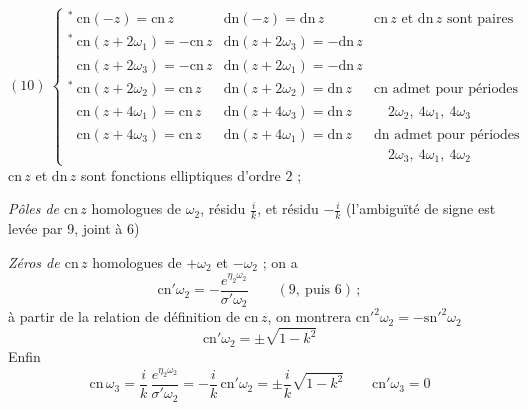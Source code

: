 \documentclass[11pt,a4paper]{article}
\begin{document}
\[
(10)\ \left\lbrace
\begin{array}{lll}
{}^{*}\ \mathrm{cn}(-z) = \mathrm{cn}\,z & \mathrm{dn}(-z) = \mathrm{dn}\,z &
\text{$\mathrm{cn}\,z$ et $\mathrm{dn}\,z$ sont paires}\\[4pt]
{}^{*}\ \mathrm{cn}(z+2\omega_1) = -\mathrm{cn}\,z & \mathrm{dn}(z+2\omega_3) = -\mathrm{dn}\,z & \\
\phantom{{}^{*}}\ \mathrm{cn}(z+2\omega_3) = -\mathrm{cn}\,z & \mathrm{dn}(z+2\omega_1) = -\mathrm{dn}\,z & \\[4pt]
{}^{*}\ \mathrm{cn}(z+2\omega_2) = \mathrm{cn}\,z & \mathrm{dn}(z+2\omega_2) = \mathrm{dn}\,z &
\text{$\mathrm{cn}$ admet pour périodes}\\
\phantom{{}^{*}}\ \mathrm{cn}(z+4\omega_1) = \mathrm{cn}\,z & \mathrm{dn}(z+4\omega_3) = \mathrm{dn}\,z &
\quad 2\omega_2,\ 4\omega_1,\ 4\omega_3\\
\phantom{{}^{*}}\ \mathrm{cn}(z+4\omega_3) = \mathrm{cn}\,z & \mathrm{dn}(z+4\omega_1) = \mathrm{dn}\,z &
\text{$\mathrm{dn}$ admet pour périodes}\\
& & \quad 2\omega_3,\ 4\omega_1,\ 4\omega_2
\end{array}
\right.
\]
$\mathrm{cn}\,z$ et $\mathrm{dn}\,z$ sont fonctions elliptiques d'ordre $2$ ;

\emph{Pôles de $\mathrm{cn}\,z$} homologues de $\omega_2$,
résidu $\frac{i}{k}$, et   résidu
$-\frac{i}{k}$
(l'ambiguïté de signe est levée par 9, joint à 6)

 \emph{Zéros de $\mathrm{cn}\,z$} homologues
de $+\omega_2$ et $-\omega_2$ ; on a
\[
\mathrm{cn}'\omega_2 = -\frac{e^{\eta_2\omega_2}}{\sigma'\omega_2}
\qquad (9,\ \text{puis } 6)\,;
\]
à partir de la relation de définition de $\mathrm{cn}\,z$, on montrera
$\mathrm{cn}'^2\omega_2 = -\mathrm{sn}'^2\omega_2$
\[
\mathrm{cn}'\omega_2 = \pm\sqrt{1-k^2}
\]
Enfin
\[
\mathrm{cn}\,\omega_3 = \frac{i}{k}\,\frac{e^{\eta_2\omega_2}}{\sigma'\omega_2}
= -\frac{i}{k}\,\mathrm{cn}'\omega_2 = \pm\frac{i}{k}\sqrt{1-k^2}
\qquad \mathrm{cn}'\omega_3 = 0
\]
\end{document}
